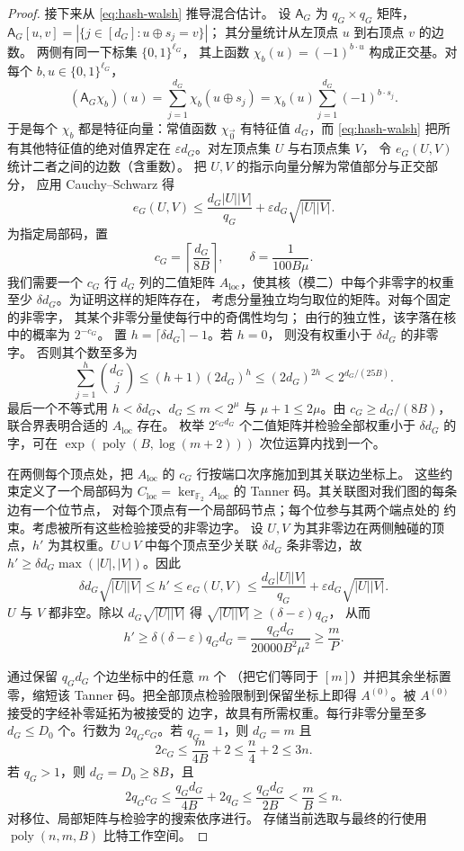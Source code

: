 \documentclass[11pt,reqno]{amsart}
\numberwithin{equation}{section}
\theoremstyle{definition}\newtheorem{definition}[theorem]{定义}
\theoremstyle{remark}\newtheorem{remark}[theorem]{注}
\newcommand{\poly}{\operatorname{poly}}
\renewcommand{\le}{\leqslant}
\renewcommand{\ge}{\geqslant}
\begin{document}
\begin{proof}
接下来从 \eqref{eq:hash-walsh} 推导混合估计。
设 $\mathsf A_G$ 为 $q_G\times q_G$ 矩阵，
$\mathsf A_G[u,v]=|\{j\in[d_G]:u\oplus s_j=v\}|$；
其分量统计从左顶点 $u$ 到右顶点 $v$ 的边数。
两侧有同一下标集 $\{0,1\}^{\ell_G}$，
其上函数 $\chi_b(u)=(-1)^{b\cdot u}$
构成正交基。对每个 $b,u\in\{0,1\}^{\ell_G}$，
\[
 (\mathsf A_G\chi_b)(u)
 =\sum_{j=1}^{d_G}\chi_b(u\oplus s_j)
 =\chi_b(u)\sum_{j=1}^{d_G}(-1)^{b\cdot s_j}.
\]
于是每个 $\chi_b$ 都是特征向量：常值函数
$\chi_{\vec{0}}$ 有特征值 $d_G$，而
\eqref{eq:hash-walsh} 把所有其他特征值的绝对值界定在
$\varepsilon d_G$。对左顶点集 $U$ 与右顶点集 $V$，
令 $e_G(U,V)$ 统计二者之间的边数（含重数）。
把 $U,V$ 的指示向量分解为常值部分与正交部分，
应用 Cauchy--Schwarz 得
\begin{equation}\label{eq:hash-mixing}
 e_G(U,V)\le
 \frac{d_G|U||V|}{q_G}
 +\varepsilon d_G\sqrt{|U||V|}.
\end{equation}
为指定局部码，置
\[
 c_G=\left\lceil\frac{d_G}{8B}\right\rceil,
 \qquad \delta=\frac1{100B\mu}.
\]
我们需要一个 $c_G$ 行 $d_G$ 列的二值矩阵
$A_{\mathrm{loc}}$，使其核（模二）中每个非零字的权重
至少 $\delta d_G$。为证明这样的矩阵存在，
考虑分量独立均匀取位的矩阵。对每个固定的非零字，
其某个非零分量使每行中的奇偶性均匀；
由行的独立性，该字落在核中的概率为 $2^{-c_G}$。
置 $h=\lceil\delta d_G\rceil-1$。若 $h=0$，
则没有权重小于 $\delta d_G$ 的非零字。
否则其个数至多为
\[
 \sum_{j=1}^{h}\binom{d_G}{j}
 \le(h+1)(2d_G)^h
 \le(2d_G)^{2h}
 <2^{d_G/(25B)}.
\]
最后一个不等式用 $h<\delta d_G$、$d_G\le m<2^\mu$
与 $\mu+1\le2\mu$。由 $c_G\ge d_G/(8B)$，
联合界表明合适的 $A_{\mathrm{loc}}$ 存在。
枚举 $2^{c_Gd_G}$ 个二值矩阵并检验全部权重小于
$\delta d_G$ 的字，可在 $\exp(\poly(B,\log(m+2)))$
次位运算内找到一个。

在两侧每个顶点处，把 $A_{\mathrm{loc}}$ 的 $c_G$
行按端口次序施加到其关联边坐标上。
这些约束定义了一个局部码为
$C_{\mathrm{loc}}=\ker_{\mathbb F_2}A_{\mathrm{loc}}$
的 Tanner 码。其关联图对我们图的每条边有一个位节点，
对每个顶点有一个局部码节点；每个位参与其两个端点处的
约束。考虑被所有这些检验接受的非零边字。
设 $U,V$ 为其非零边在两侧触碰的顶点，$h'$
为其权重。$U\cup V$ 中每个顶点至少关联
$\delta d_G$ 条非零边，故
$h'\ge\delta d_G\max(|U|,|V|)$。因此
\[
 \delta d_G\sqrt{|U||V|}
 \le h'\le e_G(U,V)
 \le\frac{d_G|U||V|}{q_G}
       +\varepsilon d_G\sqrt{|U||V|}.
\]
$U$ 与 $V$ 都非空。除以 $d_G\sqrt{|U||V|}$
得 $\sqrt{|U||V|}\ge(\delta-\varepsilon)q_G$，
从而
\[
 h'\ge\delta(\delta-\varepsilon)q_Gd_G
 =\frac{q_Gd_G}{20000B^2\mu^2}\ge\frac mP.
\]

通过保留 $q_Gd_G$ 个边坐标中的任意 $m$ 个
（把它们等同于 $[m]$）并把其余坐标置零，缩短该
Tanner 码。把全部顶点检验限制到保留坐标上即得
$A^{(0)}$。被 $A^{(0)}$ 接受的字经补零延拓为被接受的
边字，故具有所需权重。每行非零分量至多 $d_G\le D_0$
个。行数为 $2q_Gc_G$。若 $q_G=1$，则 $d_G=m$ 且
\[
 2c_G\le\frac{m}{4B}+2\le\frac n4+2\le3n.
\]
若 $q_G>1$，则 $d_G=D_0\ge8B$，且
\[
 2q_Gc_G\le\frac{q_Gd_G}{4B}+2q_G
 \le\frac{q_Gd_G}{2B}<\frac mB\le n.
\]
对移位、局部矩阵与检验字的搜索依序进行。
存储当前选取与最终的行使用 $\poly(n,m,B)$
比特工作空间。
\end{proof}
\end{document}
